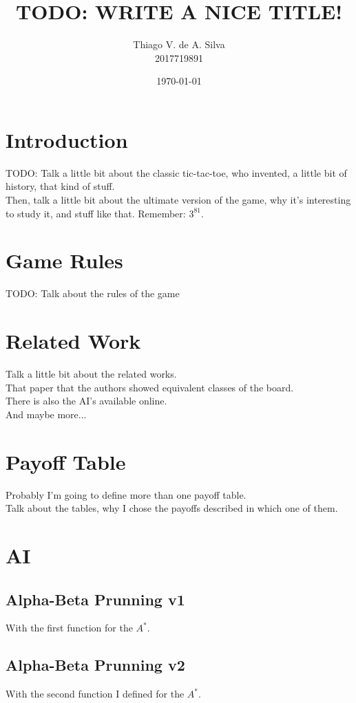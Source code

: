 \documentclass[10pt]{article}
\title{\textbf{TODO: WRITE A NICE TITLE!}}
\author{Thiago V. de A. Silva\\2017719891}
\date{\today}
\begin{document}
\maketitle

\section{Introduction}

TODO: Talk a little bit about the classic tic-tac-toe, who invented, a little bit of history, that kind of stuff.\\

Then, talk a little bit about the ultimate version of the game, why it's interesting to study it, and stuff like that.
Remember: $3^{81}$.

\section{Game Rules}
TODO: Talk about the rules of the game



\section{Related Work}
Talk a little bit about the related works.\\
That paper that the authors showed equivalent classes of the board.\\
There is also the AI's available online.\\
And maybe more...



\section{Payoff Table}
Probably I'm going to define more than one payoff table.\\
Talk about the tables, why I chose the payoffs described in which one of them.



\section{AI}
\subsection{Alpha-Beta Prunning v1}
With the first function for the $A^*$.

\subsection{Alpha-Beta Prunning v2}
With the second function I defined for the $A^*$.
\end{document}
